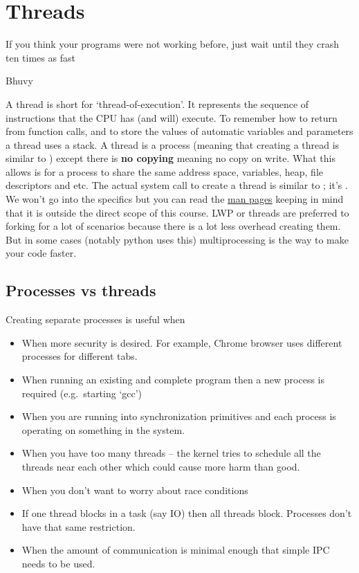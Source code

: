 \chapter{Threads}

\epigraph{If you think your programs were not working before, just wait until they crash ten times as fast}{Bhuvy}

A thread is short for `thread-of-execution'.
It represents the sequence of instructions that the CPU has (and will) execute.
To remember how to return from function calls, and to store the values of automatic variables and parameters a thread uses a stack.
A thread is a process (meaning that creating a thread is similar to ) except there is \textbf{no copying} meaning no copy on write.
What this allows is for a process to share the same address space, variables, heap, file descriptors and etc.
The actual system call to create a thread is similar to ; it's .
We won't go into the specifics but you can read the \href{http://man7.org/linux/man-pages/man2/clone.2.html}{man pages} keeping in mind that it is outside the direct scope of this course.
LWP or threads are preferred to forking for a lot of scenarios because there is a lot less overhead creating them. But in some cases (notably python uses this) multiprocessing is the way to make your code faster.

\section{Processes vs threads}

Creating separate processes is useful when
\begin{itemize}
\item When more security is desired. For example, Chrome browser uses different processes for different tabs.
\item When running an existing and complete program then a new process is required (e.g.~starting `gcc') 
\item When you are running into synchronization primitives and each process is operating on something in the system.
\item When you have too many threads -- the kernel tries to schedule all the threads near each other which could cause more harm than good.
\item When you don't want to worry about race conditions
\item If one thread blocks in a task (say IO) then all threads block. Processes don't have that same restriction.
\item When the amount of communication is minimal enough that simple IPC needs to be used.
\end{itemize}


